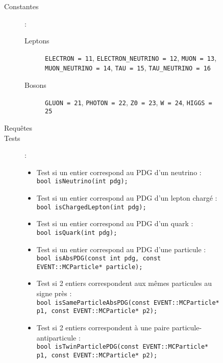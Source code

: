 \begin{figure}[h!]

	\begin{description}
		\item[Constantes] :\\
		\begin{flushleft}
		\begin{description}
			\item[Leptons]
    				\verb|ELECTRON = 11|,
    				\verb|ELECTRON_NEUTRINO = 12|,
    				\verb|MUON = 13|,
    				\verb|MUON_NEUTRINO = 14|,
    				\verb|TAU = 15|,
    				\verb|TAU_NEUTRINO = 16|

    			\item[Bosons]
    				\verb|GLUON = 21|,
    				\verb|PHOTON = 22|,
    				\verb|Z0 = 23|,
    				\verb|W = 24|,
    				\verb|HIGGS = 25|
		\end{description}
		\end{flushleft}
		
		\item[Requêtes]
		
		\item[Tests] :\newline
		\begin{itemize}
	
			\item Test si un entier correspond au PDG d'un neutrino :\\
\verb|bool isNeutrino(int pdg);|

			\item Test si un entier correspond au PDG d'un lepton chargé :\\
\verb|bool isChargedLepton(int pdg);|

			\item Test si un entier correspond au PDG d'un quark :\\
\verb|bool isQuark(int pdg);|

			\item Test si un entier correspond au PDG d'une particule :\\
\verb|bool isAbsPDG(const int pdg, const EVENT::MCParticle* particle);|

			\item Test si 2 entiers correspondent aux mêmes particules au signe près :\\
\verb|bool isSameParticleAbsPDG(const EVENT::MCParticle* p1, const EVENT::MCParticle* p2);|

			\item Test si 2 entiers correspondent à une paire particule-antiparticule :\\
\verb|bool isTwinParticlePDG(const EVENT::MCParticle* p1, const EVENT::MCParticle* p2);|
    

\end{itemize}
\end{description}
\end{figure}
